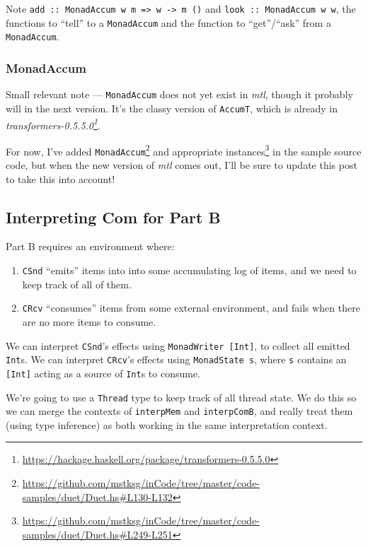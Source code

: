\documentclass[]{article}
\renewcommand{\href}[2]{#2\footnote{\url{#1}}}
\begin{document}
Note
\texttt{add\ ::\ MonadAccum\ w\ m\ =\textgreater{}\ w\ -\textgreater{}\ m\ ()}
and \texttt{look\ ::\ MonadAccum\ w\ w}, the functions to ``tell'' to a
\texttt{MonadAccum} and the function to ``get''/``ask'' from a
\texttt{MonadAccum}.

\subsubsection{MonadAccum}\label{monadaccum}

Small relevant note --- \texttt{MonadAccum} does not yet exist in \emph{mtl},
though it probably will in the next version. It's the classy version of
\texttt{AccumT}, which is already in
\emph{\href{https://hackage.haskell.org/package/transformers-0.5.5.0}{transformers-0.5.5.0}}.

For now,
\href{https://github.com/mstksg/inCode/tree/master/code-samples/duet/Duet.hs\#L130-L132}{I've
added \texttt{MonadAccum}} and
\href{https://github.com/mstksg/inCode/tree/master/code-samples/duet/Duet.hs\#L249-L251}{appropriate
instances} in the sample source code, but when the new version of \emph{mtl}
comes out, I'll be sure to update this post to take this into account!

\subsection{Interpreting Com for Part B}\label{interpreting-com-for-part-b}

Part B requires an environment where:

\begin{enumerate}
\def\labelenumi{\arabic{enumi}.}
\tightlist
\item
  \texttt{CSnd} ``emits'' items into into some accumulating log of items, and we
  need to keep track of all of them.
\item
  \texttt{CRcv} ``consumes'' items from some external environment, and fails
  when there are no more items to consume.
\end{enumerate}

We can interpret \texttt{CSnd}'s effects using \texttt{MonadWriter\ {[}Int{]}},
to collect all emitted \texttt{Int}s. We can interpret \texttt{CRcv}'s effects
using \texttt{MonadState\ s}, where \texttt{s} contains an \texttt{{[}Int{]}}
acting as a source of \texttt{Int}s to consume.

We're going to use a \texttt{Thread} type to keep track of all thread state. We
do this so we can merge the contexts of \texttt{interpMem} and
\texttt{interpComB}, and really treat them (using type inference) as both
working in the same interpretation context.
\end{document}
